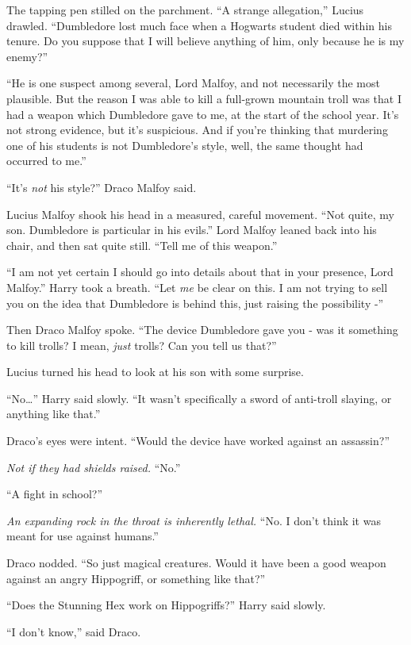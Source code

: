The tapping pen stilled on the parchment. ``A strange allegation,''
Lucius drawled. ``Dumbledore lost much face when a Hogwarts student died
within his tenure. Do you suppose that I will believe anything of him,
only because he is my enemy?''

``He is one suspect among several, Lord Malfoy, and not necessarily the
most plausible. But the reason I was able to kill a full-grown mountain
troll was that I had a weapon which Dumbledore gave to me, at the start
of the school year. It's not strong evidence, but it's suspicious. And
if you're thinking that murdering one of his students is not
Dumbledore's style, well, the same thought had occurred to me.''

``It's \emph{not} his style?'' Draco Malfoy said.

Lucius Malfoy shook his head in a measured, careful movement. ``Not
quite, my son. Dumbledore is particular in his evils.'' Lord Malfoy
leaned back into his chair, and then sat quite still. ``Tell me of this
weapon.''

``I am not yet certain I should go into details about that in your
presence, Lord Malfoy.'' Harry took a breath. ``Let \emph{me} be clear
on this. I am not trying to sell you on the idea that Dumbledore is
behind this, just raising the possibility -''

Then Draco Malfoy spoke. ``The device Dumbledore gave you - was it
something to kill trolls? I mean, \emph{just} trolls? Can you tell us
that?''

Lucius turned his head to look at his son with some surprise.

``No\ldots{}'' Harry said slowly. ``It wasn't specifically a sword of
anti-troll slaying, or anything like that.''

Draco's eyes were intent. ``Would the device have worked against an
assassin?''

\emph{Not if they had shields raised.} ``No.''

``A fight in school?''

\emph{An expanding rock in the throat is inherently lethal.} ``No. I
don't think it was meant for use against humans.''

Draco nodded. ``So just magical creatures. Would it have been a good
weapon against an angry Hippogriff, or something like that?''

``Does the Stunning Hex work on Hippogriffs?'' Harry said slowly.

``I don't know,'' said Draco.

